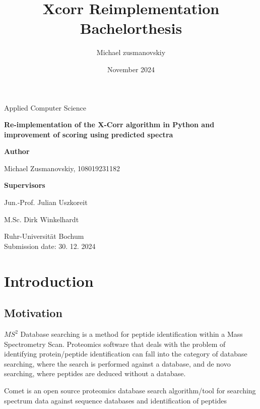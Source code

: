 \documentclass{article}
\title{Xcorr Reimplementation Bachelorthesis}
\author{Michael zusmanovskiy}
\date{November 2024}
\begin{document}
\begin{titlepage}
    \begin{center}
        \LARGE
        Applied Computer Science

        \vspace{1.5cm}
            
        \LARGE
        \textbf{Re-implementation of the X-Corr algorithm in Python and improvement of scoring using predicted spectra}
            
        \vspace{1.5cm}

        \LARGE
        \textbf{Author}
        
        Michael Zusmanovskiy, 108019231182
        
        \vspace{1.5cm}
        
        \LARGE
        \textbf{Supervisors}
        
        Jun.-Prof. Julian Uszkoreit
        
        M.Sc. Dirk Winkelhardt
            
        \vfill
            

        \vspace{0.8cm}

        \Large
        Ruhr-Universität Bochum\\
        
        Submission date: 30. 12. 2024
            
    \end{center}
\end{titlepage}


\section{Introduction}
\subsection{Motivation}
\(MS^2\) Database searching is a method for peptide identification within a Mass Spectrometry Scan. Proteomics software
that deals with the problem of identifying protein/peptide identification can fall into the category of database searching,
where the search is performed against a database, and de novo searching, where peptides are deduced without a database.

Comet is an open source proteomics database search algorithm/tool for searching spectrum data against sequence databases and identification of peptides\cite{comet}
\end{document}
